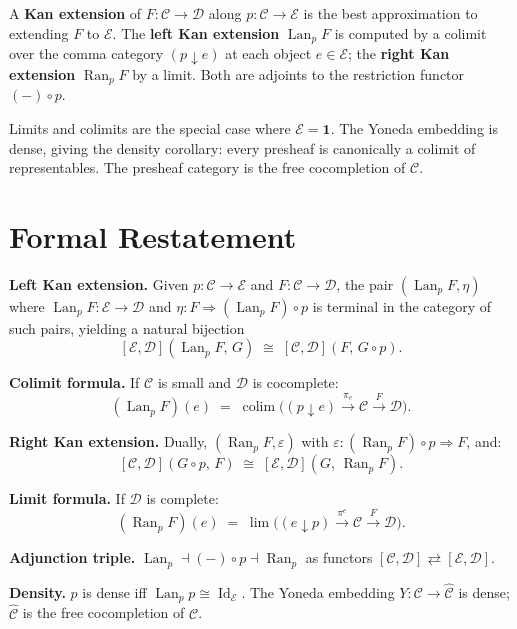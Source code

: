 \begin{summarybox}
A \textbf{Kan extension} of $F : \mathcal{C} \to \mathcal{D}$ along
$p : \mathcal{C} \to \mathcal{E}$ is the best approximation to extending $F$
to $\mathcal{E}$. The \textbf{left Kan extension} $\operatorname{Lan}_p F$ is
computed by a colimit over the comma category $(p \downarrow e)$ at each
object $e \in \mathcal{E}$; the \textbf{right Kan extension} $\operatorname{Ran}_p F$
by a limit. Both are adjoints to the restriction functor $(-) \circ p$.

Limits and colimits are the special case where $\mathcal{E} = \mathbf{1}$.
The Yoneda embedding is dense, giving the density corollary: every presheaf
is canonically a colimit of representables. The presheaf category is the free
cocompletion of $\mathcal{C}$.
\end{summarybox}

\section{Formal Restatement}

\begin{formalrestatement}
\textbf{Left Kan extension.} Given $p : \mathcal{C} \to \mathcal{E}$ and
$F : \mathcal{C} \to \mathcal{D}$, the pair $(\operatorname{Lan}_p F, \eta)$
where $\operatorname{Lan}_p F : \mathcal{E} \to \mathcal{D}$ and
$\eta : F \Rightarrow (\operatorname{Lan}_p F) \circ p$ is terminal in the category
of such pairs, yielding a natural bijection
\[
  [\mathcal{E}, \mathcal{D}](\operatorname{Lan}_p F,\, G) \;\cong\;
  [\mathcal{C}, \mathcal{D}](F,\, G \circ p).
\]

\textbf{Colimit formula.} If $\mathcal{C}$ is small and $\mathcal{D}$ is cocomplete:
\[
  (\operatorname{Lan}_p F)(e) \;=\; \operatorname{colim}\bigl((p \downarrow e)
  \xrightarrow{\pi_e} \mathcal{C} \xrightarrow{F} \mathcal{D}\bigr).
\]

\textbf{Right Kan extension.} Dually, $(\operatorname{Ran}_p F, \varepsilon)$ with
$\varepsilon : (\operatorname{Ran}_p F) \circ p \Rightarrow F$, and:
\[
  [\mathcal{C}, \mathcal{D}](G \circ p,\, F) \;\cong\;
  [\mathcal{E}, \mathcal{D}](G,\, \operatorname{Ran}_p F).
\]

\textbf{Limit formula.} If $\mathcal{D}$ is complete:
\[
  (\operatorname{Ran}_p F)(e) \;=\; \lim\bigl((e \downarrow p)
  \xrightarrow{\pi^e} \mathcal{C} \xrightarrow{F} \mathcal{D}\bigr).
\]

\textbf{Adjunction triple.} $\operatorname{Lan}_p \dashv (-) \circ p \dashv \operatorname{Ran}_p$
as functors $[\mathcal{C}, \mathcal{D}] \rightleftarrows [\mathcal{E}, \mathcal{D}]$.

\textbf{Density.} $p$ is dense iff $\operatorname{Lan}_p p \cong \operatorname{Id}_\mathcal{E}$.
The Yoneda embedding $Y : \mathcal{C} \to \hat{\mathcal{C}}$ is dense;
$\hat{\mathcal{C}}$ is the free cocompletion of $\mathcal{C}$.
\end{formalrestatement}
